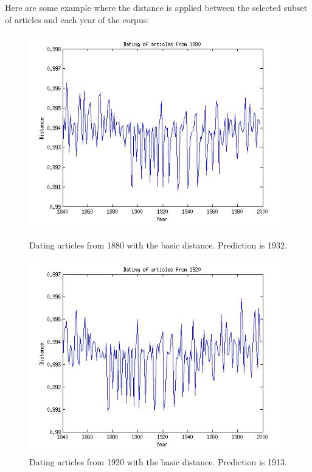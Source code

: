 Here are some example where the distance is applied between the selected subset of articles and each year of the corpus:
\begin{figure}[H]
    \begin{minipage}[b]{0.3\linewidth}
        \includegraphics[scale=0.25]{Pictures/date_articles/distance1/dating1880.jpg}
        \caption{Dating articles from 1880 with the basic distance. Prediction is 1932.}
    \end{minipage}\hfill
    \begin{minipage}[b]{0.3\linewidth}
        \includegraphics[scale=0.25]{Pictures/date_articles/distance1/dating1920.jpg}
        \caption{Dating articles from 1920 with the basic distance. Prediction is 1913.}

\end{minipage}
\end{figure}

